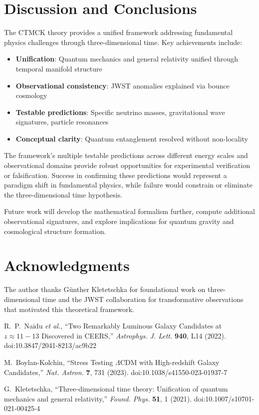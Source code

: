 \documentclass[reprint,amsmath,amssymb,aps,prd,nofootinbib]{revtex4-2}
\begin{document}
\section{Discussion and Conclusions}\label{sec:conclusions}

The CTMCK theory provides a unified framework addressing fundamental physics challenges through three-dimensional time. Key achievements include:

\begin{itemize}
\item \textbf{Unification}: Quantum mechanics and general relativity unified through temporal manifold structure
\item \textbf{Observational consistency}: JWST anomalies explained via bounce cosmology
\item \textbf{Testable predictions}: Specific neutrino masses, gravitational wave signatures, particle resonances
\item \textbf{Conceptual clarity}: Quantum entanglement resolved without non-locality
\end{itemize}

The framework's multiple testable predictions across different energy scales and observational domains provide robust opportunities for experimental verification or falsification. Success in confirming these predictions would represent a paradigm shift in fundamental physics, while failure would constrain or eliminate the three-dimensional time hypothesis.

Future work will develop the mathematical formalism further, compute additional observational signatures, and explore implications for quantum gravity and cosmological structure formation.

\section*{Acknowledgments}

The author thanks Günther Kletetschka for foundational work on three-dimensional time and the JWST collaboration for transformative observations that motivated this theoretical framework.

\begin{thebibliography}{99}

R.~P.~Naidu \textit{et al.},
``Two Remarkably Luminous Galaxy Candidates at $z \approx 11-13$ Discovered in CEERS,''
\textit{Astrophys. J. Lett.} \textbf{940}, L14 (2022).
doi:10.3847/2041-8213/ac9b22

M.~Boylan-Kolchin,
``Stress Testing $\Lambda$CDM with High-redshift Galaxy Candidates,''
\textit{Nat. Astron.} \textbf{7}, 731 (2023).
doi:10.1038/s41550-023-01937-7

G.~Kletetschka,
``Three-dimensional time theory: Unification of quantum mechanics and general relativity,''
\textit{Found. Phys.} \textbf{51}, 1 (2021).
doi:10.1007/s10701-021-00425-4

\end{thebibliography}
\end{document}
